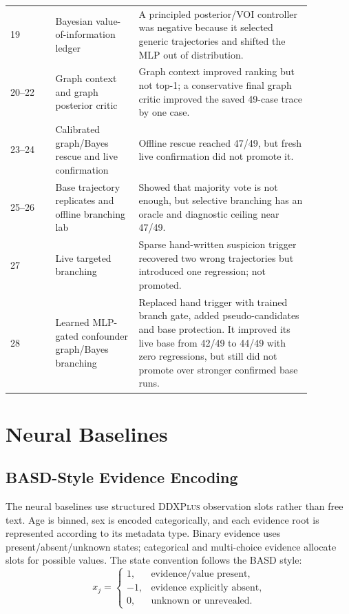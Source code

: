 \documentclass[11pt]{article}
\newcommand{\ddx}{\textsc{DDXPlus}}
\begin{document}
\begin{longtable}{p{0.13\linewidth} p{0.24\linewidth} p{0.50\linewidth}}
19 & Bayesian value-of-information ledger & A principled posterior/VOI controller was negative because it selected generic trajectories and shifted the MLP out of distribution. \\
20--22 & Graph context and graph posterior critic & Graph context improved ranking but not top-1; a conservative final graph critic improved the saved 49-case trace by one case. \\
23--24 & Calibrated graph/Bayes rescue and live confirmation & Offline rescue reached 47/49, but fresh live confirmation did not promote it. \\
25--26 & Base trajectory replicates and offline branching lab & Showed that majority vote is not enough, but selective branching has an oracle and diagnostic ceiling near 47/49. \\
27 & Live targeted branching & Sparse hand-written suspicion trigger recovered two wrong trajectories but introduced one regression; not promoted. \\
28 & Learned MLP-gated confounder graph/Bayes branching & Replaced hand trigger with trained branch gate, added pseudo-candidates and base protection. It improved its live base from 42/49 to 44/49 with zero regressions, but still did not promote over stronger confirmed base runs. \\
\bottomrule
\end{longtable}

\section{Neural Baselines}

\subsection{BASD-Style Evidence Encoding}

The neural baselines use structured \ddx{} observation slots rather than free text. Age is binned, sex is encoded categorically, and each evidence root is represented according to its metadata type. Binary evidence uses present/absent/unknown states; categorical and multi-choice evidence allocate slots for possible values. The state convention follows the BASD style:
\[
x_j =
\begin{cases}
1, & \text{evidence/value present},\\
-1, & \text{evidence explicitly absent},\\
0, & \text{unknown or unrevealed}.
\end{cases}
\]
\end{document}
